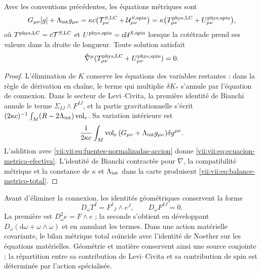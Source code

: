 \begin{proposition}
\label{vii:vii:prop:fuente-metrica-balance}
Avec les conventions précédentes, les équations métriques sont
\begin{equation}
 G_{\mu\nu}[g]+\Lambda_{\rm int}g_{\mu\nu}
 =\kappa c\bigl(\mathcal T^{S,\rm LC}_{\mu\nu}
                    +\mathcal U^{S,\rm spin}_{\mu\nu}\bigr)
 =\kappa\bigl(T^{\rm phys,LC}_{\mu\nu}
                    +U^{\rm phys,spin}_{\mu\nu}\bigr),
 \label{vii:vii:eq:ecuacion-metrica-efectiva}
\end{equation}
où \(T^{\rm phys,LC}=c\mathcal T^{S,\rm LC}\) et \(U^{\rm phys,spin}=c\mathcal U^{S,\rm spin}\) lorsque la cotétrade prend ses valeurs dans la droite de longueur. Toute solution satisfait
\begin{equation}
 \mathring\nabla^\mu
   (T^{\rm phys,LC}_{\mu\nu}+U^{\rm phys,spin}_{\mu\nu})=0.
 \label{vii:vii:eq:balance-metrico-total}
\end{equation}
\end{proposition}
\begin{proof}
L'élimination de \(K\) conserve les équations des variables
restantes : dans la règle de dérivation en chaîne, le terme qui multiplie
\(\delta K_*\) s'annule par l'équation de connexion. Dans le secteur
de Levi--Civita, la première identité de Bianchi annule le terme
\(\Sigma_{IJ}\wedge F^{IJ}\), et la partie gravitationnelle s'écrit
\((2\kappa c)^{-1}\int_M(R-2\Lambda_{\rm int})\operatorname{vol}_e\).
Sa variation intérieure est
\[
 \frac1{2\kappa c}\int_M\operatorname{vol}_e\,
        (G_{\mu\nu}+\Lambda_{\rm int}g_{\mu\nu})\delta g^{\mu\nu}.
\]
L'addition avec \eqref{vii:vii:eq:fuentes-normalizadas-accion} donne \eqref{vii:vii:eq:ecuacion-metrica-efectiva}. L'identité de Bianchi contractée pour \(\mathring\nabla\), la compatibilité métrique et la constance de \(\kappa\) et \(\Lambda_{\rm int}\) dans la carte produisent \eqref{vii:vii:eq:balance-metrico-total}.
\end{proof}

Avant d'éliminer la connexion, les identités géométriques conservent
la forme
\begin{equation}
 D_\omega T^I=F^I{}_{J}\wedge e^J,\qquad D_\omega F^{IJ}=0.
 \label{vii:vii:eq:bianchi-cartan}
\end{equation}
La première est \(D_\omega^2e=F\wedge e\) ; la seconde s'obtient
en développant \(D_\omega(\mathrm d\omega+\omega\wedge\omega)\)
et en annulant les termes. Dans une action matérielle covariante, le
bilan métrique total coïncide avec l'identité de Noether sur les
équations matérielles. Géométrie et matière conservent ainsi une source
conjointe ; la répartition entre sa contribution de Levi--Civita et sa
contribution de spin est déterminée par l'action spécialisée.
